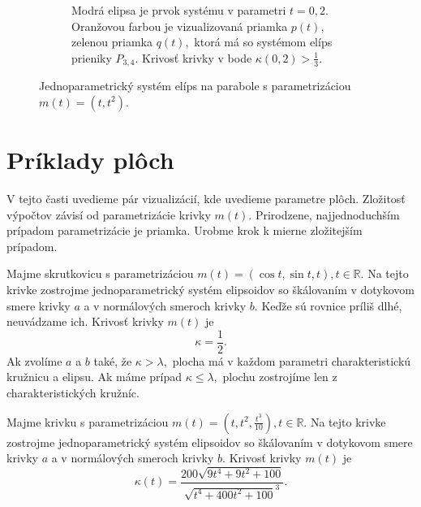 \begin{figure}[h]
\begin{subfigure}[b]{0.49\textwidth}
        	\caption{Modrá elipsa je prvok systému v parametri $t=0,2.$ Oranžovou farbou je vizualizovaná priamka $p(t)$, zelenou priamka $q(t),$ ktorá má so systémom elíps prieniky $P_{3,4}$. Krivosť krivky v bode $\kappa(0,2) > \frac{1}{3}.$}
        \label{fig:parabola_2}
    \end{subfigure}
    	\caption[Jednoparametrický systém elíps na parabole.]{Jednoparametrický systém elíps na parabole s parametrizáciou $m(t)=(t, t^2)$. }
    \label{fig:parabola}
\end{figure}


\section{Príklady plôch}
V tejto časti uvedieme pár vizualizácií, kde uvedieme parametre plôch. Zložitosť výpočtov závisí od parametrizácie krivky $m(t).$ Prirodzene, najjednoduchším prípadom parametrizácie je priamka. Urobme krok k mierne zložitejším prípadom.
\begin{example}[Skrutkovica]
Majme skrutkovicu s parametrizáciou $m(t)=(\cos t, \sin t, t), t \in \mathbb{R}.$ Na tejto krivke zostrojme jednoparametrický systém elipsoidov so škálovaním v dotykovom smere krivky $a$ a v normálových smeroch krivky $b$. Keďže sú rovnice príliš dlhé, neuvádzame ich. 
Krivosť krivky $m(t)$ je
$$
\kappa = \frac{1}{2}.
$$
Ak zvolíme $a$ a $b$ také, že $\kappa > \lambda, $ plocha má v každom parametri charakteristickú kružnicu a elipsu.
Ak máme prípad $\kappa \leq \lambda,$ plochu zostrojíme len z charakteristických kružníc. 
\end{example}

\begin{example}[Bienert]
Majme krivku s parametrizáciou $m(t)=(t, t^2, \frac{t^3}{10}), t \in \mathbb{R}.$ Na tejto krivke zostrojme jednoparametrický systém elipsoidov so škálovaním v dotykovom smere krivky $a$ a v normálových smeroch krivky $b$.
Krivosť krivky $m(t)$ je
$$
\kappa(t) = \frac{200 \sqrt{9 t^{4} + 9 t^{2} + 100}}{\sqrt{ t^{4} + 400 t^{2} + 100}^3}.
$$
\end{example}

